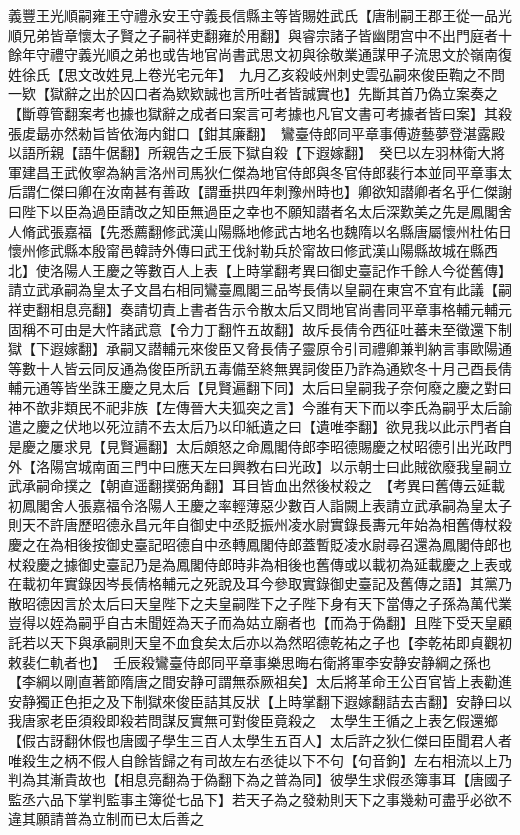 義豐王光順嗣雍王守禮永安王守義長信縣主等皆賜姓武氏【唐制嗣王郡王從一品光順兄弟皆章懷太子賢之子嗣祥吏翻雍於用翻】與睿宗諸子皆幽閉宫中不出門庭者十餘年守禮守義光順之弟也或告地官尚書武思文初與徐敬業通謀甲子流思文於嶺南復姓徐氏【思文改姓見上卷光宅元年】　九月乙亥殺岐州刺史雲弘嗣來俊臣鞫之不問一欵【獄辭之出於囚口者為欵欵誠也言所吐者皆誠實也】先斷其首乃偽立案奏之【斷尊管翻案考也據也獄辭之成者曰案言可考據也凡官文書可考據者皆曰案】其殺張䖍朂亦然勑旨皆依海内鉗口【鉗其廉翻】　鸞臺侍郎同平章事傅遊藝夢登湛露殿以語所親【語牛倨翻】所親告之壬辰下獄自殺【下遐嫁翻】　癸巳以左羽林衛大將軍建昌王武攸寧為納言洛州司馬狄仁傑為地官侍郎與冬官侍郎裴行本並同平章事太后謂仁傑曰卿在汝南甚有善政【謂垂拱四年刺豫州時也】卿欲知譛卿者名乎仁傑謝曰陛下以臣為過臣請改之知臣無過臣之幸也不願知譛者名太后深歎美之先是鳳閣舍人脩武張嘉福【先悉薦翻修武漢山陽縣地修武古地名也魏隋以名縣唐屬懷州杜佑日懷州修武縣本殷甯邑韓詩外傳曰武王伐紂勒兵於甯故曰修武漢山陽縣故城在縣西北】使洛陽人王慶之等數百人上表【上時掌翻考異曰御史臺記作千餘人今從舊傳】請立武承嗣為皇太子文昌右相同鸞臺鳳閣三品岑長倩以皇嗣在東宫不宜有此議【嗣祥吏翻相息亮翻】奏請切責上書者告示令散太后又問地官尚書同平章事格輔元輔元固稱不可由是大忤諸武意【令力丁翻忤五故翻】故斥長倩令西征吐蕃未至徵還下制獄【下遐嫁翻】承嗣又譛輔元來俊臣又脅長倩子靈原令引司禮卿兼判納言事歐陽通等數十人皆云同反通為俊臣所訊五毒備至終無異詞俊臣乃詐為通欵冬十月己酉長倩輔元通等皆坐誅王慶之見太后【見賢遍翻下同】太后曰皇嗣我子奈何廢之慶之對曰神不歆非類民不祀非族【左傳晉大夫狐突之言】今誰有天下而以李氏為嗣乎太后諭遣之慶之伏地以死泣請不去太后乃以印紙遺之曰【遺唯李翻】欲見我以此示門者自是慶之屢求見【見賢遍翻】太后頗怒之命鳳閣侍郎李昭德賜慶之杖昭德引出光政門外【洛陽宫城南面三門中曰應天左曰興教右曰光政】以示朝士曰此賊欲廢我皇嗣立武承嗣命撲之【朝直遥翻撲弼角翻】耳目皆血出然後杖殺之　【考異曰舊傳云延載初鳳閣舍人張嘉福令洛陽人王慶之率輕薄惡少數百人詣闕上表請立武承嗣為皇太子則天不許唐歷昭德永昌元年自御史中丞貶振州凌水尉實錄長夀元年始為相舊傳杖殺慶之在為相後按御史臺記昭德自中丞轉鳳閣侍郎蓋暫貶凌水尉尋召還為鳳閣侍郎也杖殺慶之據御史臺記乃是為鳳閣侍郎時非為相後也舊傳或以載初為延載慶之上表或在載初年實錄因岑長倩格輔元之死說及耳今參取實錄御史臺記及舊傳之語】其黨乃散昭德因言於太后曰天皇陛下之夫皇嗣陛下之子陛下身有天下當傳之子孫為萬代業豈得以姪為嗣乎自古未聞姪為天子而為姑立廟者也【而為于偽翻】且陛下受天皇顧託若以天下與承嗣則天皇不血食矣太后亦以為然昭德乾祐之子也【李乾祐即貞觀初敕裴仁軌者也】　壬辰殺鸞臺侍郎同平章事樂思晦右衛將軍李安静安静綱之孫也【李綱以剛直著節隋唐之間安静可謂無忝厥祖矣】太后將革命王公百官皆上表勸進安静獨正色拒之及下制獄來俊臣詰其反狀【上時掌翻下遐嫁翻詰去吉翻】安静曰以我唐家老臣須殺即殺若問謀反實無可對俊臣竟殺之　太學生王循之上表乞假還鄉【假古訝翻休假也唐國子學生三百人太學生五百人】太后許之狄仁傑曰臣聞君人者唯殺生之柄不假人自餘皆歸之有司故左右丞徒以下不句【句音鉤】左右相流以上乃判為其漸貴故也【相息亮翻為于偽翻下為之普為同】彼學生求假丞簿事耳【唐國子監丞六品下掌判監事主簿從七品下】若天子為之發勑則天下之事幾勑可盡乎必欲不違其願請普為立制而已太后善之

